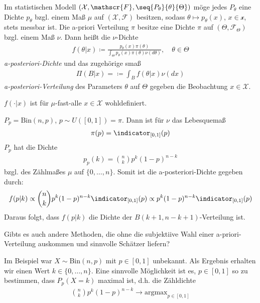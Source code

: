 \documentclass[a4paper]{scrartcl}
\begin{document}
		\begin{definition}
			Im statistischen Modell $(\mathcal{X},\mathscr{F},\seq{P_\theta}{\theta}{\Theta})$ möge jedes $P_\theta$ eine Dichte $p_\theta$ bzgl. einem Maß $\mu$ auf $(\mathcal{X},\mathscr{F})$ besitzen, sodass $\theta\mapsto p_\theta(x)$, $x\in\mathcal{x}$, stets messbar ist. Die a-priori Verteilung $\pi$ besitze eine Dichte $\pi$ auf $(\Theta,\mathscr{F}_\Theta)$ bzgl. einem Maß $\nu$. Dann heißt die $\nu$-Dichte
			\begin{align*}
				f(\theta|x)\coloneq\frac{p_\theta(x)\pi(\theta)}{\int_\Theta p_\theta(x)\pi(\theta)\nu(d\theta)},\quad \theta\in\Theta
			\end{align*}
			\emph{a-posteriori-Dichte} und das zugehörige \Wk smaß
			\begin{align*}
				\Pi(B|x)=\coloneq \int_B f(\theta|x)\nu(dx)
			\end{align*}
			\emph{a-posteriori-Verteilung} des Parameters $\theta$ auf $\Theta$ gegeben die Beobachtung $x\in\mathcal{X}$.
		\end{definition}
		\begin{remark}
			$f(\cdot|x)$ ist für $\mu$-fast-alle $x\in\mathcal{X}$ wohldefiniert.
		\end{remark}
		\begin{example}
			$P_p=\text{Bin}(n,p)$, $p\sim U([0,1])=\pi$. Dann ist für $\nu$ das Lebesquemaß
			\begin{align*}
				\pi(p)=\indicator_{[0,1]}(p)
			\end{align*}
			$P_p$ hat die Dichte
			\begin{align*}
				p_p(k)=\binom{n}{k}p^k(1-p)^{n-k}
			\end{align*}
			bzgl. des Zählmaßes $\mu$ auf $\{0,\dots,n\}$. Somit ist die a-posteriori-Dichte gegeben durch:
			\begin{align*}
				f(p|k)\propto \binom{n}{k}p^k(1-p)^{n-k}\indicator_{[0,1]}(p)\propto p^k(1-p)^{n-k}\indicator_{[0,1]}(p)
			\end{align*}
			Daraus folgt, dass $f(p|k)$ die Dichte der $B(k+1,n-k+1)$-Verteilung ist.
		\end{example}
		\begin{motivation}
			Gibts es auch andere Methoden, die ohne die subjektiive Wahl einer a-priori-Verteilung auskommen und sinnvolle Schätzer liefern?
			
			Im Beispiel war $X\sim$Bin$(n,p)$ mit $p\in[0,1]$ unbekannt. Als Ergebnis erhalten wir einen Wert $k\in\{0,\dots,n\}$. Eine sinnvolle Möglichkeit ist es, $p\in[0,1]$ so zu bestimmen, dass $P_p(X=k)$ maximal ist, d.h. die Zähldichte
			\begin{align*}
				\binom{n}{k}p^k(1-p)^{n-k}\rightarrow \text{argmax}_{p\in{[0,1]}}
			\end{align*}
		\end{motivation}
\end{document}

